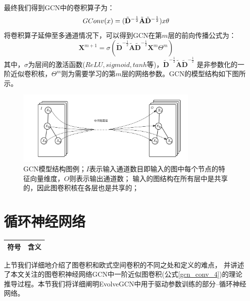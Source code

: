   最终我们得到GCN\textsuperscript{\cite{kipfGCN}}中的卷积算子为：
  \begin{equation} \label{gcn_conv_4}
    GConv(\mathnormal{x}) = 
    (\tilde{\mathbf{D}}^{-\frac{1}{2}} \tilde{\mathbf{A}} \tilde{\mathbf{D}}^{-\frac{1}{2}})
    \mathnormal{x}
    \theta
  \end{equation}
  将卷积算子延伸至多通道情况下，可以得到GCN在第$m$层的前向传播公式为：
  \begin{equation} \label{gcn_forward}
    \mathbf{X}^{m+1} = \sigma(
      \tilde{\mathbf{D}}^{-\frac{1}{2}} \tilde{\mathbf{A}} \tilde{\mathbf{D}}^{-\frac{1}{2}}
      \mathbf{X}^{m}\Theta^{m}
      )
  \end{equation}
  其中，$\sigma$为层间的激活函数($ReLU, sigmoid, tanh$等)，$ \tilde{\mathbf{D}}^{-\frac{1}{2}} \tilde{\mathbf{A}} \tilde{\mathbf{D}}^{-\frac{1}{2}}$
  是非参数化的一阶近似卷积核，$\Theta^{m}$则为需要学习的第$m$层的网络参数。GCN的模型结构如下图所示。
  \begin{figure}[htbp]
    \centering
    \includegraphics[width=0.8\textwidth]{Figures/GCN-model.png}
    \caption{GCN模型结构图例；$I$表示输入通道数目即输入的图中每个节点的特征向量维度，$O$则表示输出通道数；
    输入的图结构在所有层中是共享的，因此图卷积核在各层也是共享的；}
    \label{pic:GCN-model}
  \end{figure}
  
  \section{循环神经网络} \label{sec:B2}
      \begin{center}
        \begin{tabular}{ll}
          \toprule
          符号 & 含义\\ 
          \midrule
          
          \bottomrule
        \end{tabular}
      \end{center}

      上节我们详细地介绍了图卷积和欧式空间卷积的不同之处和定义的难点，
      并讲述了本文关注的图卷积神经网络GCN中一阶近似图卷积(公式\ref{gcn_conv_4})的理论
      推导过程。本节我们将详细阐明EvolveGCN中用于驱动参数训练的部分--循环神经网络。

